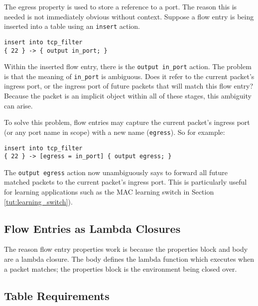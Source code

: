 The egress property is used to store a reference to a port.
The reason this is needed is not immediately obvious without context.
Suppose a flow entry is being inserted into a table using an
\texttt{insert} action.

\begin{codepage}
\begin{lstlisting}
insert into tcp_filter
{ 22 } -> { output in_port; }
\end{lstlisting}
\end{codepage}

Within the inserted flow entry, there is the \texttt{output in\_port} action.
The problem is that the meaning of \texttt{in\_port} is ambiguous. 
Does it refer to the current packet's ingress port, or the ingress port of
future packets that will match this flow entry? Because the packet is
an implicit object within all of these stages, this ambiguity can
arise.

To solve this problem, flow entries may capture the current packet's ingress
port (or any port name in scope) with a new name (\texttt{egress}). So for example:

\begin{codepage}
\begin{lstlisting}
insert into tcp_filter
{ 22 } -> [egress = in_port] { output egress; }
\end{lstlisting}
\end{codepage}

The \texttt{output egress} action now unambiguously says to forward all future
matched packets to the current packet's ingress port.
This is particularly useful for learning applications such as the MAC learning switch in Section
\ref{tut:learning_switch}).

\subsection{Flow Entries as Lambda Closures}

The reason flow entry properties work is because the properties block and body are a lambda closure. 
The body defines the lambda function which executes when a packet matches; the properties block is the environment being closed over.

\subsection{Table Requirements} \label{tut:table_req}


